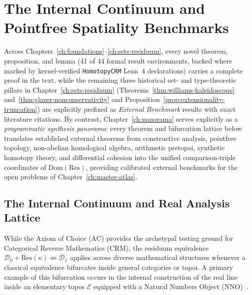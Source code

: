 \section{The Internal Continuum and Pointfree Spatiality Benchmarks}\label{sec:panorama-continuum-spatial}

\begin{remark}\label{rem:panorama-genre-signpost}%
%
Across Chapters~\ref{ch:foundations}--\ref{ch:sets-residuum}, every novel theorem, proposition, and lemma (41 of 44 formal result environments, backed where marked by kernel-verified \texttt{HomotopyCRM} Lean~4 declarations) carries a complete proof in the text, while the remaining three historical set- and type-theoretic pillars in Chapter~\ref{ch:sets-residuum} (Theorems~\ref{thm:williams-kaleidoscope} and~\ref{thm:glazer-nonconservativity} and Proposition~\ref{prop:extensionality-truncation}) are explicitly prefixed as \emph{External Benchmark} results with exact literature citations. By contrast, Chapter~\ref{ch:panorama} serves explicitly as a \emph{programmatic synthesis panorama}: every theorem and bifurcation lattice below translates established external theorems from constructive analysis, pointfree topology, non-abelian homological algebra, arithmetic pretopoi, synthetic homotopy theory, and differential cohesion into the unified comparison-triple coordinates of $\mathrm{Dom}(\mathrm{Res})$, providing calibrated external benchmarks for the open problems of Chapter~\ref{ch:master-atlas}.
\end{remark}

\subsection{The Internal Continuum and Real Analysis Lattice}

While the Axiom of Choice ($\mathrm{AC}$) provides the archetypal testing ground for Categorical Reverse Mathematics ($\mathrm{CRM}$), the residuum equivalence $\mathcal{D}_0 + \mathrm{Res}(\kappa) \iff \mathcal{D}_1$ applies across diverse mathematical structures whenever a classical equivalence bifurcates inside general categories or topoi. A primary example of this bifurcation occurs in the internal construction of the real line inside an elementary topos $\mathcal{E}$ equipped with a Natural Numbers Object ($\mathrm{NNO}$)~\cite{Johnstone82,Johnstone02}.

